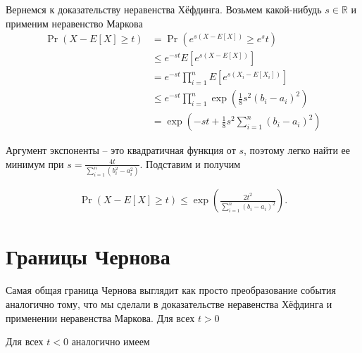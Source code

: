 \documentclass[12pt]{article}
\newcommand\R{\mathbb{R}}
\begin{document}
Вернемся к доказательству неравенства Хёфдинга. Возьмем какой-нибудь $s \in \R$ и применим неравенство Маркова
\begin{align*}
  \Pr(X - E[X] \ge t) &= \Pr(e^{s(X - E[X])} \ge e^st) \\
                      &\le e^{-st} E[e^{s(X - E[X])}] \\
                      &= e^{-st} \prod_{i = 1}^n E[e^{s(X_i - E[X_i])}] \\
                      &\le e^{-st} \prod_{i = 1}^n \exp\left(\frac{1}{8}s^2(b_i - a_i)^2\right) \\
                      &= \exp\left(-st + \frac{1}{8}s^2 \sum_{i = 1}^n (b_i - a_i)^2\right)
\end{align*}

Аргумент экспоненты -- это квадратичная функция от $s$, поэтому легко найти ее минимум при $s = \frac{4t}{\sum_{i = 1}^n (b_i^2 - a_i^2)}$. Подставим и получим

\begin{align*}
  \Pr(X - E[X] \ge t) \le \exp\left(\frac{2t^2}{\sum_{i = 1}^n (b_i - a_i)^2}\right).
\end{align*}

\section{Границы Чернова}

Самая общая граница Чернова выглядит как просто преобразование события аналогично тому, что мы сделали в доказательстве неравенства Хёфдинга и применении неравенства Маркова. Для всех $t > 0$
\begin{center}
\end{center}

Для всех $t < 0$ аналогично имеем
\begin{center}
\end{center}
\end{document}

